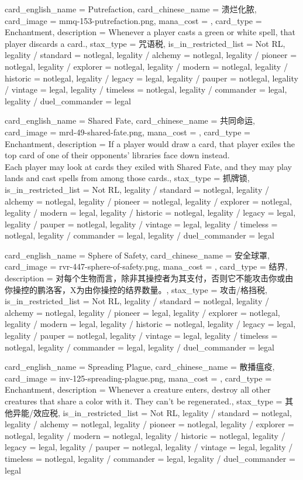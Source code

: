\documentclass[lang = cn, color = black, 10pt]{AllThatStax}
\begin{document}
\card
{
	card_english_name = {Putrefaction},
	card_chinese_name = {溃烂化脓},
	card_image = mmq-153-putrefaction.png,
	mana_cost = ,
	card_type = Enchantment,
	description = {Whenever a player casts a green or white spell, that player discards a card.},
	stax_type = 咒语税,
	is_in_restricted_list = Not RL,
	legality / standard = notlegal,
	legality / alchemy = notlegal,
	legality / pioneer = notlegal,
	legality / explorer = notlegal,
	legality / modern = notlegal,
	legality / historic = notlegal,
	legality / legacy = legal,
	legality / pauper = notlegal,
	legality / vintage = legal,
	legality / timeless = notlegal,
	legality / commander = legal,
	legality / duel_commander = legal
}

\card
{
	card_english_name = {Shared Fate},
	card_chinese_name = {共同命运},
	card_image = mrd-49-shared-fate.png,
	mana_cost = ,
	card_type = Enchantment,
	description = {If a player would draw a card, that player exiles the top card of one of their opponents' libraries face down instead.\\
		Each player may look at cards they exiled with Shared Fate, and they may play lands and cast spells from among those cards.},
	stax_type = 抓牌锁,
	is_in_restricted_list = Not RL,
	legality / standard = notlegal,
	legality / alchemy = notlegal,
	legality / pioneer = notlegal,
	legality / explorer = notlegal,
	legality / modern = legal,
	legality / historic = notlegal,
	legality / legacy = legal,
	legality / pauper = notlegal,
	legality / vintage = legal,
	legality / timeless = notlegal,
	legality / commander = legal,
	legality / duel_commander = legal
}

\card
{
	card_english_name = {Sphere of Safety},
	card_chinese_name = {安全球罩},
	card_image = rvr-447-sphere-of-safety.png,
	mana_cost = ,
	card_type = 结界,
	description = {对每个生物而言，除非其操控者为其支付，否则它不能攻击你或由你操控的鹏洛客，X为由你操控的结界数量。},
	stax_type = 攻击/格挡税,
	is_in_restricted_list = Not RL,
	legality / standard = notlegal,
	legality / alchemy = notlegal,
	legality / pioneer = legal,
	legality / explorer = notlegal,
	legality / modern = legal,
	legality / historic = notlegal,
	legality / legacy = legal,
	legality / pauper = notlegal,
	legality / vintage = legal,
	legality / timeless = notlegal,
	legality / commander = legal,
	legality / duel_commander = legal
}

\card
{
	card_english_name = {Spreading Plague},
	card_chinese_name = {散播瘟疫},
	card_image = inv-125-spreading-plague.png,
	mana_cost = ,
	card_type = Enchantment,
	description = {Whenever a creature enters, destroy all other creatures that share a color with it. They can't be regenerated.},
	stax_type = 其他异能/效应税,
	is_in_restricted_list = Not RL,
	legality / standard = notlegal,
	legality / alchemy = notlegal,
	legality / pioneer = notlegal,
	legality / explorer = notlegal,
	legality / modern = notlegal,
	legality / historic = notlegal,
	legality / legacy = legal,
	legality / pauper = notlegal,
	legality / vintage = legal,
	legality / timeless = notlegal,
	legality / commander = legal,
	legality / duel_commander = legal
}
\end{document}
